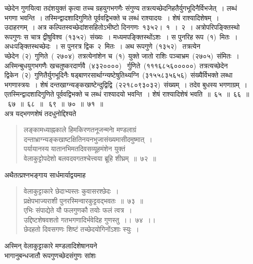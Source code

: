 \documentclass[11pt, openany]{book}
\begin{document}
\newpage
\thispagestyle{fancy}
\fancyhf{}
\noindent
च्छेदेन गुणयित्वा तदंशयुक्तं कृत्वा तच्च ग्रहयुगभगणैः संगुण्य तत्रत्यच्छेदनिहतैर्युगभूदिनैर्विभजेत्~। लब्धं भगणा भवन्ति~। तस्मिन्द्वादशादिगुणिते
पूर्ववद्विभक्ते च लब्धं राश्यादयः~। शेषं राश्यादिशेषम्~। उदाहरणम्~। अत्र
कल्पितस्वच्छेदांशसहितोऽभीष्टो दिनगणः~१३५२।~१~।~२~। अत्रोपरिपङ्क्तिस्थो रूपगुणः स चात्र द्वीषुविश्व~(१३५२)~संख्यः~। मध्यमपङ्क्तिस्थोंऽशः~। स पुनरिह रूप~(१)~मितः~।अधःपङ्क्तिस्थच्छेदः~। स पुनरत्र द्विक~२~मितः~। अथ रूपगुणे~(१३५२)~ तत्रत्येन च्छेदेन~(२)~गुणिते~( २७०४)~तत्रत्येनांशेन च~(१)~युक्ते जातो राशिः पञ्चाभ्रम~(२७०५)~संमितः~। अस्मिन्बुधयुगभगणैः खचतुष्करदार्णवै~(४३२००००)~ र्गुणिते~(१११६८५६०००००)~तत्रत्यच्छेदेन द्विकेन~(२)~गुणितैर्युगभूदिनैः षड्बाणरसार्थाग्न्यष्टेषुतिथ्यग्नि~(३१५५८३५६५६)~संख्यैर्विभक्ते लब्धा भगणास्त्रयः~। शेषं दन्तखाग्न्यङ्कखाष्टेन्दुद्विद्वि~(२२१८०९३०३२)~संख्यम्~। तदेव बुधस्य भगणाग्रम्~। एतस्मिन्द्वादशादिगुणिते पूर्ववद्विभक्ते च लब्धं राश्यादयो भवन्ति~। शेषं राश्यादिशेषं भवति~॥~६५~॥~६६~॥~६७~॥~६८~॥
~६९~॥~७०~॥~७१~॥\\
\indent
अत्र यद्भगणशेषं तदधुनोद्दिश्यते\textendash
\begin{quote}
{\ks लङ्कामध्याह्नकाले हिमकिरणतनूजन्मनाे मण्डलाग्रं\\
दन्ताभ्राग्न्यङ्कखाष्टक्षितिनयनभुजासंख्यमासीदमुष्मात्~।\\
पर्यायानस्य यातानभिमतदिवसव्यूहमंशेन युक्तं\\
वेलाकुट्टोपदेशो बलवदवगतश्चेत्त्वया ब्रूहि शीघ्रम्~॥~७२~॥}
\end{quote}
\indent
अथैतत्प्रश्नभङ्गाय सार्धमार्याद्वयमाह\textendash
\begin{quote}
{\ks वेलाकुट्टाकारे छेदाभ्यस्तः कुवासरश्छेदः~।\\
प्रक्षेपभाज्यराशी पुनरस्मिन्वारकुट्टवद्भवतः~॥~७३~॥\\
एभिः संपाद्येते यौ फलगुणकौ तयोः फलं त्वत्र~।\\
उद्दिष्टशेषवशतो गतभगणादिर्भवेदिह गुणस्तु~।।~७४~।।\\
छेदहतो दिवसगणः शिष्टं तच्छेदयोगिनोंऽशाः स्युः~।}
\end{quote}
\indent
अस्मिन् वेलाकुट्टाकारे मण्डलादिशेषानयने\\
\indent
भागानुबन्धजातौ रूपगुणच्छेदसंगुणः सांशः\textendash
\end{document}
